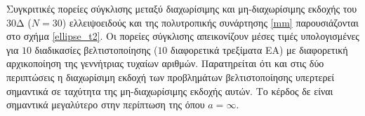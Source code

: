 Συγκριτικές πορείες σύγκλισης μεταξύ διαχωρίσιμης και μη-διαχωρίσιμης εκδοχής του $30$Δ ($N\!=\!30$) ελλειψοειδούς και της πολυτροπικής συνάρτησης \ref{mm} παρουσιάζονται στο σχήμα \ref{ellipse_t2}. Οι πορείες σύγκλισης απεικονίζουν μέσες τιμές υπολογισμένες για $10$ διαδικασίες βελτιστοποίησης ($10$ διαφορετικά τρεξίματα ΕΑ) με διαφορετική αρχικοποίηση της γεννήτριας τυχαίων αριθμών.  Παρατηρείται ότι και στις δύο περιπτώσεις η διαχωρίσιμη εκδοχή των προβλημάτων βελτιστοποίησης υπερτερεί σημαντικά σε ταχύτητα της μη-διαχωρίσιμης εκδοχής αυτών. Το κέρδος δε είναι σημαντικά μεγαλύτερο στην περίπτωση της όπου $a=\infty$.        

\begin{figure}[h!]
\begin{minipage}[b]{0.5\linewidth}
 \centering
\end{minipage}
\begin{minipage}[b]{0.5\linewidth}
 \centering

\end{minipage}
\end{figure}
